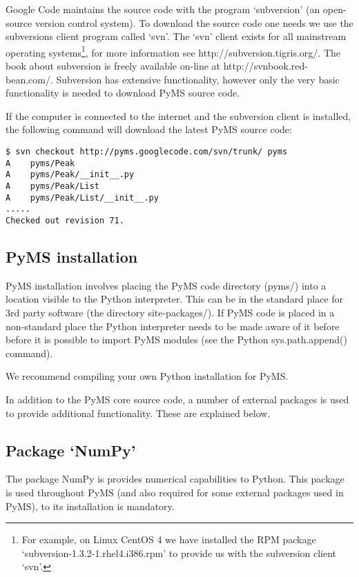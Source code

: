 Google Code maintains the source code with the program `subversion'
(an open-source version control system). To download the source code
one needs we use the subversions client program called `svn'. The `svn'
client exists for all mainstream operating systems\footnote{For example,
on Linux CentOS 4 we have installed the RPM package
`subversion-1.3.2-1.rhel4.i386.rpm' to provide us with the subversion
client `svn'.}, for more information see http://subversion.tigris.org/.
The book about subversion is freely available on-line at
http://svnbook.red-bean.com/. Subversion has extensive functionality,
however only the very basic functionality is needed to download PyMS
source code.

If the computer is connected to the internet and the subversion client
is installed, the following command will download the latest PyMS source
code:

\begin{verbatim}
$ svn checkout http://pyms.googlecode.com/svn/trunk/ pyms
A    pyms/Peak
A    pyms/Peak/__init__.py
A    pyms/Peak/List
A    pyms/Peak/List/__init__.py
.....
Checked out revision 71.
\end{verbatim}

\subsection{PyMS installation}

PyMS installation involves placing the PyMS code directory (pyms/) into
a location visible to the Python interpreter. This can be in the standard
place for 3rd party software (the directory site-packages/). If PyMS code
is placed in a non-standard place the Python interpreter needs to be made
aware of it before before it is possible to import PyMS modules (see the
Python sys.path.append() command).

We recommend compiling your own Python installation for PyMS.

In addition to the PyMS core source code, a number of external packages
is used to provide additional functionality. These are explained below.

\subsection{\label{subsec:numpy}Package `NumPy'}

The package NumPy is provides numerical capabilities to Python. This
package is used throughout PyMS (and also required for some external
packages used in PyMS), to its installation is mandatory.

